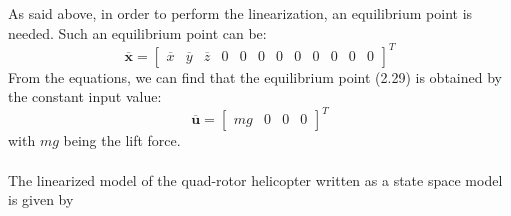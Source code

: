 As said above, in order to perform the linearization, an equilibrium point is
needed. Such an equilibrium point can be:
\begin{equation}
\overline{\mathbf{x}} = \begin{bmatrix}
\overline{x} & \overline{y} & \overline{z} & 0 & 0 & 0 & 0 & 0 & 0 & 0 & 0 & 0
\end{bmatrix}^{T}
\end{equation}
From the equations, we can find that the equilibrium point (2.29) is obtained by
the constant input value:
\begin{equation}
\overline{\mathbf{u}} = \begin{bmatrix}
mg & 0 & 0 & 0
\end{bmatrix}^{T}
\end{equation}
with $mg$ being the lift force.
\\\\
The linearized model of the quad-rotor helicopter written as a state space model is given by

